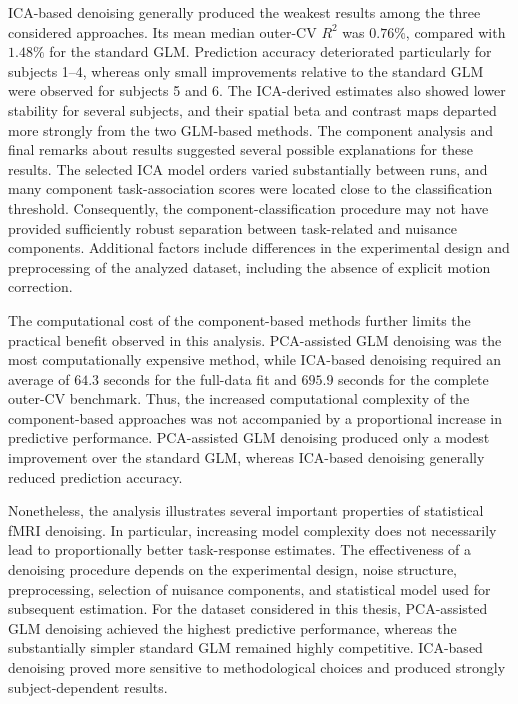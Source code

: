 \documentclass[english]{pwr_wmat_praca_dyplomowa}
\theoremstyle{definition}
\theoremstyle{remark}
\begin{document}
ICA-based denoising generally produced the weakest results among the three considered approaches. Its mean median outer-CV $R^2$ was $0.76\%$, compared with $1.48\%$ for the standard GLM. Prediction accuracy deteriorated particularly for subjects 1--4, whereas only small improvements relative to the standard GLM were observed for subjects 5 and 6. The ICA-derived estimates also showed lower stability for several subjects, and their spatial beta and contrast maps departed more strongly from the two GLM-based methods. The component analysis and final remarks about results suggested several possible explanations for these results. The selected ICA model orders varied substantially between runs, and many component task-association scores were located close to the classification threshold. Consequently, the component-classification procedure may not have provided sufficiently robust separation between task-related and nuisance components. Additional factors include differences in the experimental design and preprocessing of the analyzed dataset, including the absence of explicit motion correction.

The computational cost of the component-based methods further limits the practical benefit observed in this analysis. PCA-assisted GLM denoising was the most computationally expensive method, while ICA-based denoising required an average of $64.3$ seconds for the full-data fit and $695.9$ seconds for the complete outer-CV benchmark. Thus, the increased computational complexity of the component-based approaches was not accompanied by a proportional increase in predictive performance. PCA-assisted GLM denoising produced only a modest improvement over the standard GLM, whereas ICA-based denoising generally reduced prediction accuracy.

Nonetheless, the analysis illustrates several important properties of statistical fMRI denoising. In particular, increasing model complexity does not necessarily lead to proportionally better task-response estimates. The effectiveness of a denoising procedure depends on the experimental design, noise structure, preprocessing, selection of nuisance components, and statistical model used for subsequent estimation. For the dataset considered in this thesis, PCA-assisted GLM denoising achieved the highest predictive performance, whereas the substantially simpler standard GLM remained highly competitive. ICA-based denoising proved more sensitive to methodological choices and produced strongly subject-dependent results.


 
\end{document}
